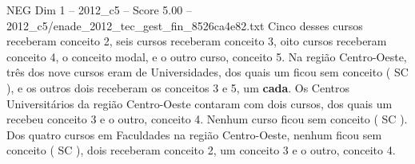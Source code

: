 \begin{textsample}{NEG Dim 1 – 2012\_c5 – Score 5.00 – 2012\_c5/enade\_2012\_tec\_gest\_fin\_8526ca4e82.txt}
Cinco desses cursos receberam conceito 2, seis cursos receberam conceito 3, oito cursos receberam conceito 4, o conceito modal, e o outro curso, conceito 5.
Na região Centro-Oeste, três dos nove cursos eram de Universidades, dos quais um ficou sem conceito ( SC ), e os outros dois receberam os conceitos 3 e 5, um \textbf{cada}.
Os Centros Universitários da região Centro-Oeste contaram com dois cursos, dos quais um recebeu conceito 3 e o outro, conceito 4.
Nenhum curso ficou sem conceito ( SC ).
Dos quatro cursos em Faculdades na região Centro-Oeste, nenhum ficou sem conceito ( SC ), dois receberam conceito 2, um conceito 3 e o outro, conceito 4.

\end{textsample}
